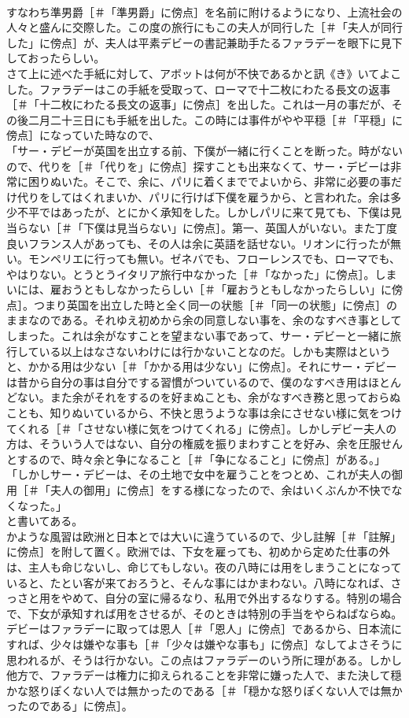 \documentclass[8pt]{extreport}
\begin{document}
\begin{CJK}{UTF8}{min}
\\	すなわち準男爵［＃「準男爵」に傍点］を名前に附けるようになり、上流社会の人々と盛んに交際した。この度の旅行にもこの夫人が同行した［＃「夫人が同行した」に傍点］が、夫人は平素デビーの書記兼助手たるファラデーを眼下に見下しておったらしい。
\\	さて上に述べた手紙に対して、アボットは何が不快であるかと訊《き》いてよこした。ファラデーはこの手紙を受取って、ローマで十二枚にわたる長文の返事［＃「十二枚にわたる長文の返事」に傍点］を出した。これは一月の事だが、その後二月二十三日にも手紙を出した。この時には事件がやや平穏［＃「平穏」に傍点］になっていた時なので、
\\	「サー・デビーが英国を出立する前、下僕が一緒に行くことを断った。時がないので、代りを［＃「代りを」に傍点］探すことも出来なくて、サー・デビーは非常に困りぬいた。そこで、余に、パリに着くまででよいから、非常に必要の事だけ代りをしてはくれまいか、パリに行けば下僕を雇うから、と言われた。余は多少不平ではあったが、とにかく承知をした。しかしパリに来て見ても、下僕は見当らない［＃「下僕は見当らない」に傍点］。第一、英国人がいない。また丁度良いフランス人があっても、その人は余に英語を話せない。リオンに行ったが無い。モンペリエに行っても無い。ゼネバでも、フローレンスでも、ローマでも、やはりない。とうとうイタリア旅行中なかった［＃「なかった」に傍点］。しまいには、雇おうともしなかったらしい［＃「雇おうともしなかったらしい」に傍点］。つまり英国を出立した時と全く同一の状態［＃「同一の状態」に傍点］のままなのである。それゆえ初めから余の同意しない事を、余のなすべき事としてしまった。これは余がなすことを望まない事であって、サー・デビーと一緒に旅行している以上はなさないわけには行かないことなのだ。しかも実際はというと、かかる用は少ない［＃「かかる用は少ない」に傍点］。それにサー・デビーは昔から自分の事は自分でする習慣がついているので、僕のなすべき用はほとんどない。また余がそれをするのを好まぬことも、余がなすべき務と思っておらぬことも、知りぬいているから、不快と思うような事は余にさせない様に気をつけてくれる［＃「させない様に気をつけてくれる」に傍点］。しかしデビー夫人の方は、そういう人ではない、自分の権威を振りまわすことを好み、余を圧服せんとするので、時々余と争になること［＃「争になること」に傍点］がある。」
\\	「しかしサー・デビーは、その土地で女中を雇うことをつとめ、これが夫人の御用［＃「夫人の御用」に傍点］をする様になったので、余はいくぶんか不快でなくなった。」
\\	と書いてある。
\\	かような風習は欧洲と日本とでは大いに違うているので、少し註解［＃「註解」に傍点］を附して置く。欧洲では、下女を雇っても、初めから定めた仕事の外は、主人も命じないし、命じてもしない。夜の八時には用をしまうことになっていると、たとい客が来ておろうと、そんな事にはかまわない。八時になれば、さっさと用をやめて、自分の室に帰るなり、私用で外出するなりする。特別の場合で、下女が承知すれば用をさせるが、そのときは特別の手当をやらねばならぬ。デビーはファラデーに取っては恩人［＃「恩人」に傍点］であるから、日本流にすれば、少々は嫌やな事も［＃「少々は嫌やな事も」に傍点］なしてよさそうに思われるが、そうは行かない。この点はファラデーのいう所に理がある。しかし他方で、ファラデーは権力に抑えられることを非常に嫌った人で、また決して穏かな怒りぽくない人では無かったのである［＃「穏かな怒りぽくない人では無かったのである」に傍点］。

\end{CJK}
\end{document}
